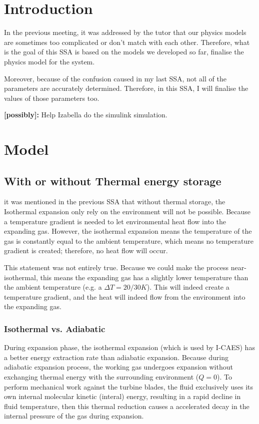 

\section{Introduction} \label{Introduction}
In the previous meeting, it was addressed by the tutor that our physics models are sometimes too complicated or don't match with each other. Therefore, what is the goal of this SSA is based on the models we developed so far, finalise the physics model for the system.

Moreover, because of the confusion caused in my last SSA, not all of the parameters are accurately determined. Therefore, in this SSA, I will finalise the values of those parameters too.

\textbf{[possibly]:} Help Izabella do the simulink simulation.

\section{Model}
\subsection{With or without Thermal energy storage}
 it was mentioned in the previous SSA that without thermal storage, the Isothermal expansion only rely on the environment will not be possible. Because a temperature gradient is needed to let environmental heat flow into the expanding gas. However, the isothermal expansion means the temperature of the gas is constantly equal to the ambient temperature, which means no temperature gradient is created; therefore, no heat flow will occur. 
 
 This statement was not entirely true. Because we could make the process near-isothermal, this means the expanding gas has a slightly lower temperature than the ambient temperature (e.g. a $\Delta T = 20/ 30K$). This will indeed create a temperature gradient, and the heat will indeed flow from the environment into the expanding gas. 
 
\subsubsection{Isothermal vs. Adiabatic}
During expansion phase, the isothermal expansion (which is used by I-CAES) has a better energy extraction rate than adiabatic expansion. Because during adiabatic expansion process, the working gas undergoes expansion without exchanging thermal energy with the surrounding environment ($Q=0$). To perform mechanical work against the turbine blades, the fluid exclusively uses its own internal molecular kinetic (interal) energy, resulting in a rapid decline in fluid temperature, then this thermal reduction causes a accelerated decay in the internal pressure of the gas during expansion. 

